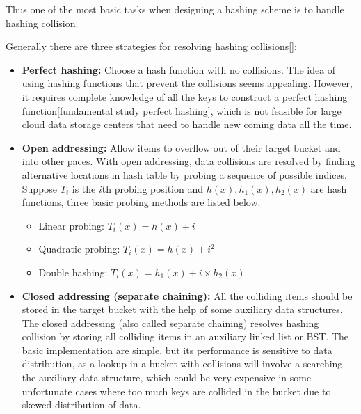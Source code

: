 \documentclass[runningheads]{llncs}
\begin{document}
Thus one of the most basic tasks when designing a hashing scheme is to handle hashing collision.

Generally there are three strategies for resolving hashing collisions[]:

\begin{itemize}
    \item \textbf{Perfect hashing:} Choose a hash function with no collisions. The idea of using hashing functions that prevent the collisions seems appealing. However, it requires complete knowledge of all the keys to construct a perfect hashing function[fundamental study perfect hashing], which is not feasible for large cloud data storage centers that need to handle new coming data all the time.

    \item \textbf{Open addressing:} Allow items to overflow out of their target bucket and into other paces. With open addressing, data collisions are resolved by finding alternative locations in hash table by probing a sequence of possible indices. Suppose $T_i$ is the $i$th probing position and $h(x), h_1(x), h_2(x)$ are hash functions, three basic probing methods are listed below.
    \begin{itemize}
        \item Linear probing: $T_i(x)=h(x)+i$
        \item Quadratic probing: $T_i(x)=h(x)+i^2$
        \item Double hashing: $T_i(x)=h_1(x)+i\times h_2(x)$
    \end{itemize}

    \item \textbf{Closed addressing (separate chaining):} All the colliding items should be stored in the target bucket with the help of some auxiliary data structures. The closed addressing (also called separate chaining) resolves hashing collision by storing all colliding items in an auxiliary linked list or BST. The basic implementation are simple, but its performance is sensitive to data distribution, as a lookup in a bucket with collisions will involve a searching the auxiliary data structure, which could be very expensive in some unfortunate cases where too much keys are collided in the bucket due to skewed distribution of data.
\end{itemize}
\end{document}
